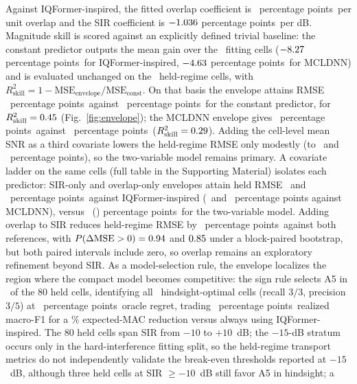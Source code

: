 \documentclass[letterpaper,journal]{IEEEtran}
\newcommand{\pp}{percentage points}
\begin{document}
Against IQFormer-inspired, the fitted overlap coefficient is
\EnvelopeIqformerOccupancySlope\ \pp\ per unit overlap and the SIR
coefficient is $-1.036$ \pp\ per dB. Magnitude skill is
scored against an explicitly defined trivial baseline: the constant predictor
outputs the mean gain over the \EnvelopeFitCells\ fitting cells
($-8.27$ \pp\ for IQFormer-inspired, $-4.63$ \pp\
for MCLDNN) and is evaluated unchanged on the \EnvelopeHoldoutCells\ held-regime
cells, with
$R^2_{\mathrm{skill}}=1-\mathrm{MSE}_{\mathrm{envelope}}/\mathrm{MSE}_{\mathrm{const}}$.
On that basis the envelope attains RMSE \EnvelopeIqformerHoldoutRmse\ \pp\
against \EnvelopeConstantRmseIQ\ \pp\ for the constant predictor, for
$R^2_{\mathrm{skill}}=0.45$ (Fig.~\ref{fig:envelope}); the
MCLDNN envelope gives \EnvelopeMcldnnHoldoutRmse\ \pp\ against
\EnvelopeConstantRmseMC\ \pp\ ($R^2_{\mathrm{skill}}=0.29$).
Adding the cell-level mean SNR as a third covariate lowers the held-regime
RMSE only modestly (to \EnvelopeThreeVarRmseIQ\ and \EnvelopeThreeVarRmseMC\ \pp),
so the two-variable model remains primary.
A covariate ladder on the same cells (full table in the Supporting Material)
isolates each predictor: SIR-only and overlap-only envelopes attain held RMSE
\LadderSirOnlyRmseIQ\ and \LadderOverlapOnlyRmseIQ\ \pp\ against
IQFormer-inspired (\LadderSirOnlyRmseMC\ and \LadderOverlapOnlyRmseMC\ \pp
against MCLDNN), versus \EnvelopeIqformerHoldoutRmse\
(\EnvelopeMcldnnHoldoutRmse) \pp\ for the two-variable model. Adding overlap
to SIR reduces held-regime RMSE by \LadderOverlapIncrementPp\ \pp\ against
both references, with $P(\Delta\mathrm{MSE}>0)=0.94$ and
$0.85$ under a block-paired bootstrap, but both paired intervals
include zero, so overlap remains an exploratory refinement beyond SIR. As a
model-selection rule, the envelope localizes the region where the compact
model becomes competitive: the sign rule selects A5 in
\SelectorOverlapSirCells\ of the 80 held cells, identifying all
\SelectorOracleCells\ hindsight-optimal cells (recall $3/3$, precision $3/5$)
at \SelectorRegretPp\ \pp\ oracle regret, trading
\SelectorRealizedFTradePp\ \pp\ realized macro-F1 for a
\SelectorMacSavingPct\% expected-MAC reduction versus always using
IQFormer-inspired. The 80 held cells span
SIR from $-10$ to $+10$~dB; the $-15$-dB stratum occurs only in the
hard-interference fitting split, so the held-regime transport metrics do not
independently validate the break-even thresholds reported at $-15$~dB,
although three held cells at SIR $\geq-10$~dB still favor A5 in hindsight; a
\end{document}
